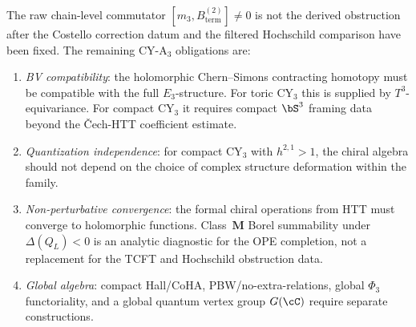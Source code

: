 \begin{remark}
\label{rem:derived-framing-actual-obstructions}
The raw chain-level commutator
$[m_3, B^{(2)}_{\mathrm{term}}]\neq0$ is not the derived obstruction
after the Costello correction datum and the filtered Hochschild
comparison have been fixed. The remaining CY-A$_3$ obligations are:
\begin{enumerate}[label=\textup{(\roman*)}]
 \item \emph{BV compatibility}: the holomorphic Chern--Simons
 contracting homotopy must be compatible with the full $E_3$-structure.
 For toric CY$_3$ this is supplied by $T^3$-equivariance. For compact
 CY$_3$ it requires compact $\bS^3$ framing data beyond the
 \v{C}ech-HTT coefficient estimate.
 \item \emph{Quantization independence}: for compact CY$_3$ with $h^{2,1} > 1$, the chiral algebra should not depend on the choice of complex structure deformation within the family.
 \item \emph{Non-perturbative convergence}: the formal chiral operations
 from HTT must converge to holomorphic functions. Class~$\mathbf M$
 Borel summability under $\Delta(Q_L)<0$ is an analytic diagnostic for
 the OPE completion, not a replacement for the TCFT and Hochschild
 obstruction data.
 \item \emph{Global algebra}: compact Hall/CoHA, PBW/no-extra-relations,
 global $\Phi_3$ functoriality, and a global quantum vertex group
 $G(\cC)$ require separate constructions.
\end{enumerate}
\end{remark}



